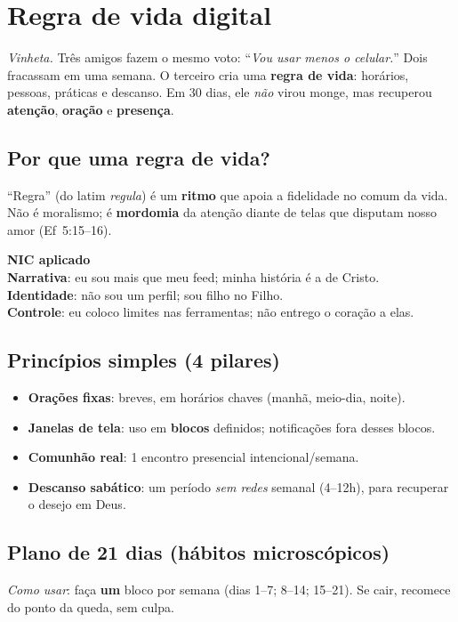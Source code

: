 \chapter{Regra de vida digital}
\noindent\textit{Vinheta.} Três amigos fazem o mesmo voto: ``\emph{Vou usar menos o celular.}'' Dois fracassam em uma semana. O terceiro cria uma \textbf{regra de vida}: horários, pessoas, práticas e descanso. Em 30 dias, ele \emph{não} virou monge, mas recuperou \textbf{atenção}, \textbf{oração} e \textbf{presença}.

\section{Por que uma regra de vida?}
``Regra'' (do latim \emph{regula}) é um \textbf{ritmo} que apoia a fidelidade no comum da vida. Não é moralismo; é \textbf{mordomia} da atenção diante de telas que disputam nosso amor (Ef~5:15--16).

\begin{nicbox}
\textbf{NIC aplicado}\\
\textbf{Narrativa}: eu sou mais que meu feed; minha história é a de Cristo.\\
\textbf{Identidade}: não sou um perfil; sou filho no Filho.\\
\textbf{Controle}: eu coloco limites nas ferramentas; não entrego o coração a elas.
\end{nicbox}

\section{Princípios simples (4 pilares)}
\begin{itemize}[leftmargin=*,noitemsep]
  \item \textbf{Orações fixas}: breves, em horários chaves (manhã, meio-dia, noite).
  \item \textbf{Janelas de tela}: uso em \textbf{blocos} definidos; notificações fora desses blocos.
  \item \textbf{Comunhão real}: 1 encontro presencial intencional/semana.
  \item \textbf{Descanso sabático}: um período \emph{sem redes} semanal (4--12h), para recuperar o desejo em Deus.
\end{itemize}

\section{Plano de 21 dias (hábitos microscópicos)}
\noindent\textit{Como usar}: faça \textbf{um} bloco por semana (dias 1--7; 8--14; 15--21). Se cair, recomece do ponto da queda, sem culpa.
